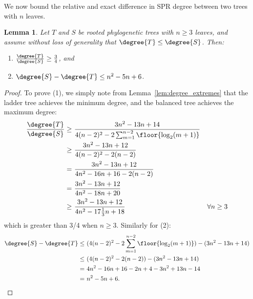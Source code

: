 \documentclass{amsart}
\newtheorem{lemma}[theorem]{Lemma}
\newcommand{\cuttable}[1]{#1} %
\begin{document}
We now bound the relative and exact difference in SPR degree between two trees with $n$ leaves.

\begin{lemma}
	\label{lem:degree_max_delta}
	Let $T$ and $S$ be rooted phylogenetic trees with $n \ge 3$ leaves, and assume without loss of generality that $\degree{T} \le \degree{S}$.
	Then:
	\begin{enumerate}
		\item $\frac{\degree{T}}{\degree{S}} \ge \frac{3}{4}$, and
		\item $\degree{S} - \degree{T} \le n^2 - 5n + 6$.
	\end{enumerate}
\end{lemma}
\begin{proof}
	To prove (1), we simply note from Lemma~\ref{lem:degree_extremes} that the ladder tree achieves the minimum degree, and the balanced tree achieves the maximum degree:
	\begin{align*}
		\frac{\degree{T}}{\degree{S}} \ge\ &\frac{3n^2 - 13n + 14}{4(n-2)^2 - 2 \sum_{m=1}^{n-2} \floor{\log_2(m+1)}} \\
		\ge\ &\frac{3n^2 - 13n + 12}{4(n-2)^2 - 2(n-2)} \\
		\cuttable{= \ &\frac{3n^2 - 13n + 12}{4n^2 - 16n + 16 - 2(n-2)} \\}
		= \ &\frac{3n^2 - 13n + 12}{4n^2 - 18n + 20} \\
		\cuttable{\ge\ &\frac{3n^2 - 13n + 12}{4n^2 - 17\frac{1}{3}n + 18} &\forall n \ge 3 \\}
	\end{align*}
	which is greater than 3/4 when $n \ge 3$.
    Similarly for (2):
	\begin{align*}
		\cuttable{\degree{S} - \degree{T}
		\le\ &(4(n-2)^2 - 2 \sum_{m=1}^{n-2} \floor{\log_2(m+1)})
		- (3n^2 - 13n + 14) \\}
		\le\ &(4(n-2)^2 - 2(n-2)) - (3n^2 - 13n + 14) \\
		\cuttable{=\ &4n^2 - 16n + 16 - 2n +4 - 3n^2 + 13n - 14 \\}
		=\ &n^2 - 5n + 6.
	\end{align*}
\end{proof}
\end{document}
